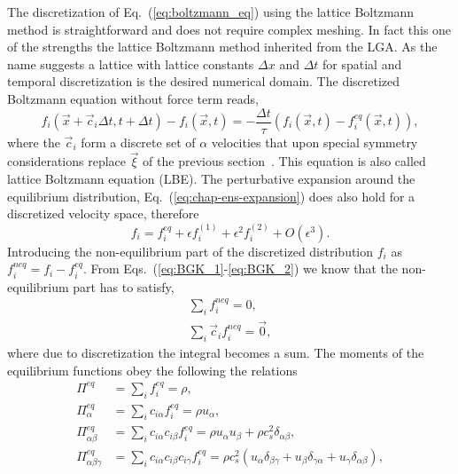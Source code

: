 The discretization of Eq.~(\ref{eq:boltzmann_eq}) using the lattice Boltzmann method is straightforward and does not require complex meshing.
In fact this one of the strengths the lattice Boltzmann method inherited from the LGA.
As the name suggests a lattice with lattice constants $\Delta x$ and $\Delta t$ for spatial and temporal discretization is the desired numerical domain. 
The discretized Boltzmann equation without force term reads,
\begin{equation}\label{eq:LBM_discret_noforces}
    f_i(\vec{x}+\vec{c}_i\Delta t, t+ \Delta t) - f_i(\vec{x}, t) = -\frac{\Delta t}{\tau}(f_i(\vec{x}, t) - f^{eq}_i(\vec{x}, t)),
\end{equation}
where the $\vec{c}_{i}$ form a discrete set of $\alpha$ velocities that upon special symmetry considerations replace $\vec{\xi}$ of the previous section~\cite{rubinsteinTheoryLatticeBoltzmann2008}.
This equation is also called lattice Boltzmann equation (LBE). 
The perturbative expansion around the equilibrium distribution, Eq.~(\ref{eq:chap-ens-expansion}) does also hold for a discretized velocity space, therefore
\begin{equation}\label{eq:expansion_f}
    f_i = f_i^{eq} + \epsilon f_i^{(1)} + \epsilon^2 f_i^{(2)} + O(\epsilon^3).
\end{equation}
Introducing the non-equilibrium part of the discretized distribution $f_{i}$ as $f_i^{neq} = f_i - f_i^{eq}$. 
From Eqs.~(\ref{eq:BGK_1}-\ref{eq:BGK_2}) we know that the non-equilibrium part has to satisfy, 
\begin{align}\label{eq:non_constraint}
    \sum_i f_i^{neq} = 0, \\
    \sum_i \vec{c}_i f_i^{neq} = \vec{0}, 
\end{align}
where due to discretization the integral becomes a sum.
The moments of the equilibrium functions obey the following the relations~\cite{chenLatticeBoltzmannMethod1998} 
\begin{align}
    \Pi^{eq} &= \sum_{i} f_{i}^{eq} = \rho, \label{eq:moments_equilibria_1}\\
    \Pi^{eq}_{\alpha} &= \sum_i c_{i\alpha}f_i^{eq} = \rho u_{\alpha}, \label{eq:moments_equilibria_2}\\
    \Pi^{eq}_{\alpha\beta} &= \sum_{i} c_{i\alpha} c_{i\beta}f_i^{eq} = \rho u_{\alpha} u_{\beta} + \rho c_s^2\delta_{\alpha\beta}, \label{eq:moments_equilibria_3}\\
    \Pi^{eq}_{\alpha\beta\gamma} &= \sum_i c_{i\alpha} c_{i\beta} c_{i\gamma}f_i^{eq} = \rho c_s^2(u_{\alpha}\delta_{\beta\gamma} + u_{\beta}\delta_{\gamma\alpha} + u_{\gamma}\delta_{\alpha\beta}), \label{eq:moments_equilibria_4}
\end{align}
